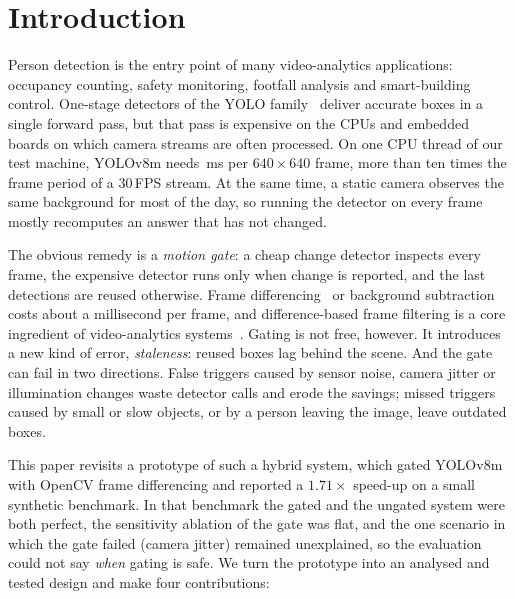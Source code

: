 \documentclass[12pt,a4paper]{article}
\theoremstyle{plain}
\theoremstyle{definition}
\begin{document}
\newpage
\tableofcontents

\newpage
{}

\section{Introduction}\label{sec:intro}

Person detection is the entry point of many video-analytics applications: occupancy counting, safety monitoring, footfall analysis and smart-building control. One-stage detectors of the YOLO family~\cite{redmon2016yolo,jocher2023yolov8} deliver accurate boxes in a single forward pass, but that pass is expensive on the CPUs and embedded boards on which camera streams are often processed. On one CPU thread of our test machine, YOLOv8m needs \YoloMs\,ms per $640\times640$ frame, more than ten times the frame period of a 30\,FPS stream. At the same time, a static camera observes the same background for most of the day, so running the detector on every frame mostly recomputes an answer that has not changed.

The obvious remedy is a \emph{motion gate}: a cheap change detector inspects every frame, the expensive detector runs only when change is reported, and the last detections are reused otherwise. Frame differencing~\cite{jain1979difference} or background subtraction~\cite{stauffer1999adaptive,zivkovic2004improved} costs about a millisecond per frame, and difference-based frame filtering is a core ingredient of video-analytics systems~\cite{kang2017noscope,li2020reducto,arefeen2022framehopper}. Gating is not free, however. It introduces a new kind of error, \emph{staleness}: reused boxes lag behind the scene. And the gate can fail in two directions. False triggers caused by sensor noise, camera jitter or illumination changes waste detector calls and erode the savings; missed triggers caused by small or slow objects, or by a person leaving the image, leave outdated boxes.

This paper revisits a prototype of such a hybrid system, which gated YOLOv8m with OpenCV frame differencing and reported a $1.71\times$ speed-up on a small synthetic benchmark. In that benchmark the gated and the ungated system were both perfect, the sensitivity ablation of the gate was flat, and the one scenario in which the gate failed (camera jitter) remained unexplained, so the evaluation could not say \emph{when} gating is safe. We turn the prototype into an analysed and tested design and make four contributions:
\end{document}
